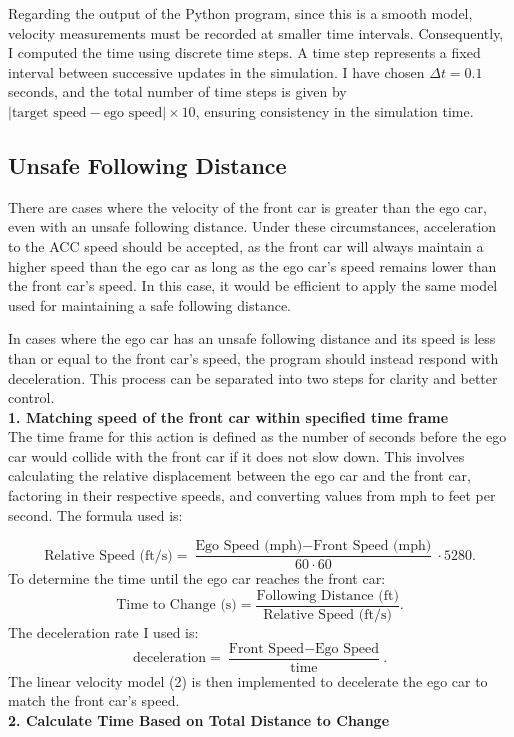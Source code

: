\documentclass[12pt]{article}
\begin{document}
Regarding the output of the Python program, since this is a smooth model, velocity measurements must be recorded at smaller time intervals. Consequently, I computed the time using discrete time steps. A time step represents a fixed interval between successive updates in the simulation. I have chosen \( \Delta t = 0.1 \) seconds, and the total number of time steps is given by \( | \text{target speed} - \text{ego speed} | \times 10 \), ensuring consistency in the simulation time.

\subsection*{Unsafe Following Distance} 

\indent There are cases where the velocity of the front car is greater than the ego car, even with an unsafe following distance. Under these circumstances, acceleration to the ACC speed should be accepted, as the front car will always maintain a higher speed than the ego car as long as the ego car's speed remains lower than the front car's speed. In this case, it would be efficient to apply the same model used for maintaining a safe following distance.

In cases where the ego car has an unsafe following distance and its speed is less than or equal to the front car's speed, the program should instead respond with deceleration. This process can be separated into two steps for clarity and better control.\vspace{1em} \\
\textbf{1. Matching speed of the front car within specified time frame}\\

The time frame for this action is defined as the number of seconds before the ego car would collide with the front car if it does not slow down. This involves calculating the relative displacement between the ego car and the front car, factoring in their respective speeds, and converting values from mph to feet per second. The formula used is:

\[
\text{Relative Speed (ft/s)} = \frac{\text{Ego Speed (mph)} - \text{Front Speed (mph)}}{60 \cdot 60} \cdot 5280.
\]
To determine the time until the ego car reaches the front car:
\[
\text{Time to Change (s)} = \frac{\text{Following Distance (ft)}}{\text{Relative Speed (ft/s)}}.
\]
The deceleration rate I used is:
\[
\text{deceleration} = \frac{\text{Front Speed} - \text{Ego Speed}}{\text{time}}.
\]
The linear velocity model (2) is then implemented to decelerate the ego car to match the front car's speed.\vspace{1em} \\
\textbf{2. Calculate Time Based on Total Distance to Change}\\
\end{document}
